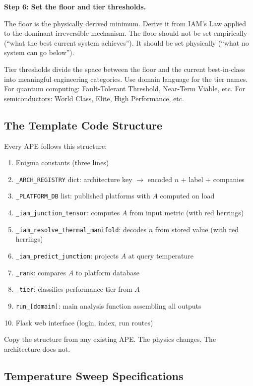 \documentclass[12pt,a4paper]{article}
\begin{document}
\textbf{Step 6: Set the floor and tier thresholds.}

The floor is the physically derived minimum. Derive it from IAM's Law applied
to the dominant irreversible mechanism. The floor should not be set empirically
(``what the best current system achieves''). It should be set physically
(``what no system can go below'').

Tier thresholds divide the space between the floor and the current best-in-class
into meaningful engineering categories. Use domain language for the tier names.
For quantum computing: Fault-Tolerant Threshold, Near-Term Viable, etc. For
semiconductors: World Class, Elite, High Performance, etc.

\subsection{The Template Code Structure}

Every APE follows this structure:
\begin{enumerate}[leftmargin=1.5em]
\item Enigma constants (three lines)
\item \texttt{\_ARCH\_REGISTRY} dict: architecture key $\to$ encoded $n$ + label + companies
\item \texttt{\_PLATFORM\_DB} list: published platforms with $A$ computed on load
\item \texttt{\_iam\_junction\_tensor}: computes $A$ from input metric (with red herrings)
\item \texttt{\_iam\_resolve\_thermal\_manifold}: decodes $n$ from stored value (with red herrings)
\item \texttt{\_iam\_predict\_junction}: projects $A$ at query temperature
\item \texttt{\_rank}: compares $A$ to platform database
\item \texttt{\_tier}: classifies performance tier from $A$
\item \texttt{run\_[domain]}: main analysis function assembling all outputs
\item Flask web interface (login, index, run routes)
\end{enumerate}

Copy the structure from any existing APE. The physics changes. The architecture does not.

\subsection{Temperature Sweep Specifications}
\label{subsec:sweep_specs}
\end{document}
